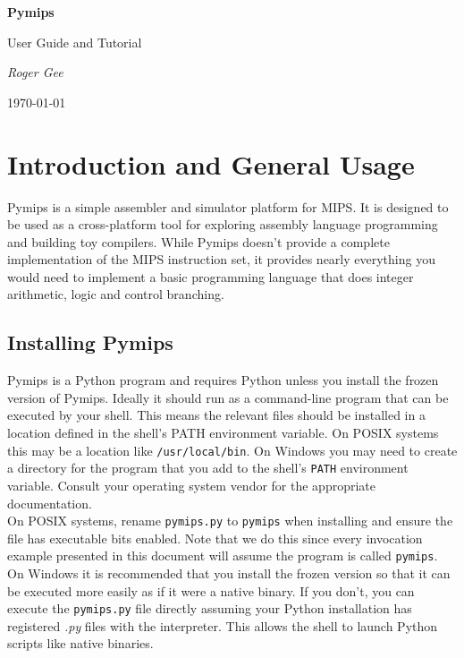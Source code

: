 \documentclass[12pt]{article}
\begin{document}
\begin{titlepage}
    \centering
    {\Huge \textbf{Pymips}\par}
    {\Large User Guide and Tutorial\par}
    \vfill
    {\textit{Roger Gee}\par}
    \large \today
\end{titlepage}

\tableofcontents
\newpage

\section{Introduction and General Usage}
\label{sec:intro}

Pymips is a simple assembler and simulator platform for MIPS. It is designed to
     be used as a cross-platform tool for exploring assembly language
     programming and building toy compilers. While Pymips doesn't provide a
     complete implementation of the MIPS instruction set, it provides nearly
     everything you would need to implement a basic programming language that
     does integer arithmetic, logic and control branching.

\subsection{Installing Pymips}

Pymips is a Python program and requires Python unless you install the frozen
     version of Pymips. Ideally it should run as a command-line program that can
     be executed by your shell. This means the relevant files should be
     installed in a location defined in the shell's PATH environment
     variable. On POSIX systems this may be a location like
     \texttt{/usr/local/bin}. On Windows you may need to create a directory for
     the program that you add to the shell's \texttt{PATH} environment
     variable. Consult your operating system vendor for the appropriate
     documentation.\\

On POSIX systems, rename \texttt{pymips.py} to \texttt{pymips} when installing
     and ensure the file has executable bits enabled. Note that we do this since
     every invocation example presented in this document will assume the program
     is called \texttt{pymips}.\\

On Windows it is recommended that you install the frozen version so that it can
     be executed more easily as if it were a native binary. If you don't, you
     can execute the \texttt{pymips.py} file directly assuming your Python
     installation has registered \textit{.py} files with the interpreter. This
     allows the shell to launch Python scripts like native binaries.\\
\end{document}
